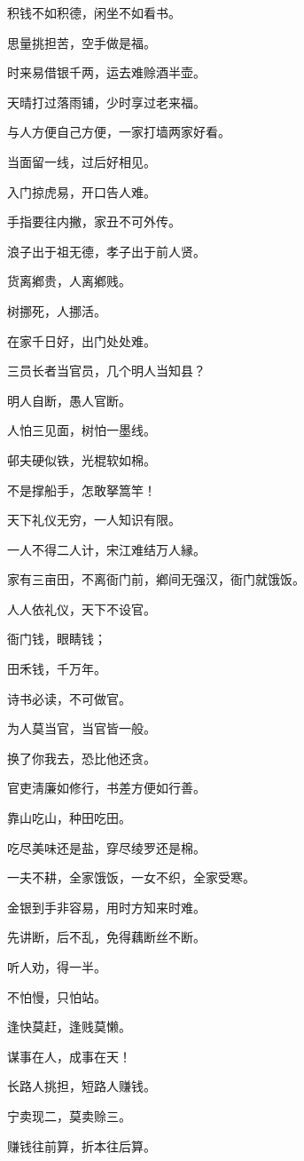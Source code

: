 \documentclass[12pt,oneside]{book}
\begin{document}
积钱不如积德，闲坐不如看书。

思量挑担苦，空手做是福。

时来易借银千两，运去难赊酒半壶。

天晴打过落雨铺，少时享过老来福。

与人方便自己方便，一家打墙两家好看。

当面留一线，过后好相见。

入门掠虎易，开口告人难。

手指要往内撇，家丑不可外传。

浪子出于祖无德，孝子出于前人贤。

货离鄕贵，人离鄕贱。

树挪死，人挪活。

在家千日好，出门处处难。

三员长者当官员，几个明人当知县？

明人自断，愚人官断。

人怕三见面，树怕一墨线。

邨夫硬似铁，光棍软如棉。

不是撑船手，怎敢拏篙竿！

天下礼仪无穷，一人知识有限。

一人不得二人计，宋江难结万人縁。

家有三亩田，不离衙门前，鄕间无强汉，衙门就饿饭。

人人依礼仪，天下不设官。

衙门钱，眼睛钱；

田禾钱，千万年。

诗书必读，不可做官。

为人莫当官，当官皆一般。

换了你我去，恐比他还贪。

官吏淸廉如修行，书差方便如行善。

靠山吃山，种田吃田。

吃尽美味还是盐，穿尽绫罗还是棉。

一夫不耕，全家饿饭，一女不织，全家受寒。

金银到手非容易，用时方知来时难。

先讲断，后不乱，免得藕断丝不断。

听人劝，得一半。

不怕慢，只怕站。

逢快莫赶，逢贱莫懒。

谋事在人，成事在天！

长路人挑担，短路人赚钱。

宁卖现二，莫卖赊三。

赚钱往前算，折本往后算。
\end{document}
